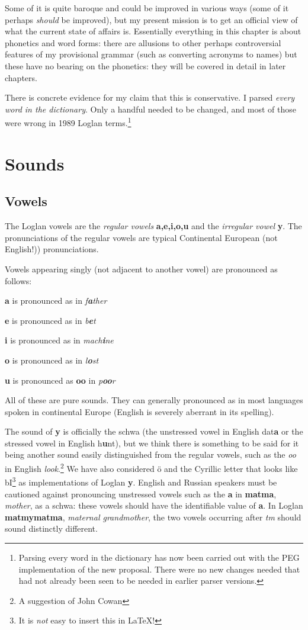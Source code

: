 \documentclass[12pt]{book}
\begin{document}
 Some of it is quite baroque and could be improved in various ways (some of it perhaps {\em should\/} be improved), but my present mission is to get an official view of what the current state of affairs is.   Essentially everything in this chapter  is about phonetics and word forms:  there are allusions to other perhaps controversial features of my provisional grammar (such as converting acronyms to names) but these have no bearing on the phonetics:  they will be covered in detail in later chapters.

There is concrete evidence for my claim that this is conservative.  I parsed {\em every word in the dictionary\/}.  Only a handful needed to be changed,
and most of those were wrong in 1989 Loglan terms.\footnote{Parsing every word in the dictionary has now been carried out with the PEG implementation of the new proposal.  There were no new changes needed that had not already been seen to be needed in earlier parser versions.}

\section{Sounds}

\subsection{Vowels}

The Loglan vowels are the {\em regular vowels} {\bf a,e,i,o,u} and the {\em irregular vowel} {\bf y}.  The pronunciations of the regular vowels are typical Continental European (not English!)) pronunciations.

Vowels appearing singly (not adjacent to another vowel) are pronounced as follows:

{\bf a} is pronounced as in {\em f{\bf a}ther\/}

{\bf e} is pronounced as in {\em b{\bf e}t\/}

{\bf i} is pronounced as in {\em mach{\bf i}ne\/}

{\bf o} is pronounced as in {\em l{\bf o}st\/}

{\bf u} is pronounced as {\bf oo} in {\em p{\bf oo}r}

All of these are pure sounds.   They can generally pronounced as  in most languages spoken in continental Europe (English is severely aberrant in its spelling).

  The sound of {\bf y} is officially the schwa (the unstressed vowel in English dat{\bf a} or the stressed vowel in English h{\bf u}nt), but we think there is something to be said for it being another sound easily distinguished from the regular vowels, such as the {\em oo} in English {\em look}.\footnote{A suggestion of John Cowan}  We have also considered \"o and the Cyrillic letter that looks like bI\footnote{It is {\em not\/} easy to insert this in LaTeX!} as implementations of Loglan {\bf y}.  English and Russian speakers must be cautioned against pronouncing unstressed vowels such as the
{\bf a} in {\bf matma}, {\em mother\/}, as a schwa:  these vowels should have the identifiable value of {\bf a}.  In Loglan {\bf matmymatma}, {\em maternal grandmother\/}, the two vowels occurring after {\em tm} should sound distinctly different.
\end{document}
